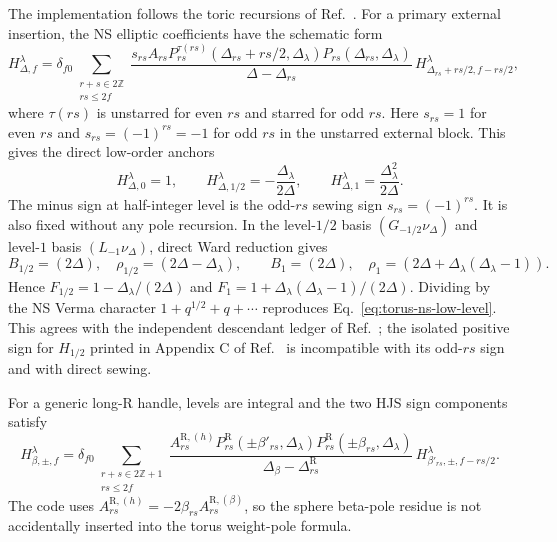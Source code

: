 \documentclass[11pt]{article}
\newcommand{\R}{\mathrm{R}}
\begin{document}
The implementation  follows the toric
recursions of Ref.~\cite{HadaszJaskolskiSuchanek2012Toric}.  For a primary
external insertion, the NS elliptic coefficients have the schematic form
\begin{equation}
 H_{\Delta,f}^{\lambda}
 =\delta_{f0}
 \sum_{\substack{r+s\in2\mathbb Z\\rs\le2f}}
 \frac{s_{rs}A_{rs}
 P_{rs}^{\tau(rs)}(\Delta_{rs}+rs/2,\Delta_\lambda)
 P_{rs}(\Delta_{rs},\Delta_\lambda)}
 {\Delta-\Delta_{rs}}\,
 H_{\Delta_{rs}+rs/2,f-rs/2}^{\lambda},
 \label{eq:torus-ns-recursion}
\end{equation}
where $\tau(rs)$ is unstarred for even $rs$ and starred for odd $rs$.
Here $s_{rs}=1$ for even $rs$ and $s_{rs}=(-1)^{rs}=-1$ for odd
$rs$ in the unstarred external block.
This gives the direct low-order anchors
\begin{equation}
 H_{\Delta,0}^{\lambda}=1,\qquad
 H_{\Delta,1/2}^{\lambda}=-\frac{\Delta_\lambda}{2\Delta},
 \qquad
 H_{\Delta,1}^{\lambda}=\frac{\Delta_\lambda^2}{2\Delta}.
 \label{eq:torus-ns-low-level}
\end{equation}
The minus sign at half-integer level is the odd-$rs$ sewing sign
$s_{rs}=(-1)^{rs}$.  It is also fixed without any pole recursion.  In the
level-$1/2$ basis $(G_{-1/2}\nu_\Delta)$ and level-$1$ basis
$(L_{-1}\nu_\Delta)$, direct Ward reduction gives
\begin{equation}
 B_{1/2}=(2\Delta),\quad
 \rho_{1/2}=(2\Delta-\Delta_\lambda),\qquad
 B_1=(2\Delta),\quad
 \rho_1=(2\Delta+\Delta_\lambda(\Delta_\lambda-1)).
 \label{eq:torus-ns-direct-matrices}
\end{equation}
Hence
$F_{1/2}=1-\Delta_\lambda/(2\Delta)$ and
$F_1=1+\Delta_\lambda(\Delta_\lambda-1)/(2\Delta)$.
Dividing by the NS Verma character
$1+q^{1/2}+q+\cdots$ reproduces
Eq.~\eqref{eq:torus-ns-low-level}.  This agrees with the independent
descendant ledger of Ref.~\cite{BelavinGeiko2018CRecursion}; the isolated
positive sign for $H_{1/2}$ printed in Appendix C of
Ref.~\cite{HadaszJaskolskiSuchanek2012Toric} is incompatible with its
odd-$rs$ sign and with direct sewing.

For a generic long-R handle, levels are integral and the two HJS sign
components satisfy
\begin{equation}
 H_{\beta,\pm,f}^{\lambda}
 =\delta_{f0}
 \sum_{\substack{r+s\in2\mathbb Z+1\\rs\le2f}}
 \frac{A_{rs}^{\R,(h)}
 P_{rs}^{\R}(\pm\beta'_{rs},\Delta_\lambda)
 P_{rs}^{\R}(\pm\beta_{rs},\Delta_\lambda)}
 {\Delta_\beta-\Delta_{rs}^{\R}}\,
 H_{\beta'_{rs},\pm,f-rs/2}^{\lambda}.
 \label{eq:torus-r-recursion}
\end{equation}
The code uses
$A_{rs}^{\R,(h)}=-2\beta_{rs}A_{rs}^{\R,(\beta)}$, so the sphere
beta-pole residue is not accidentally inserted into the torus weight-pole
formula.
\end{document}
